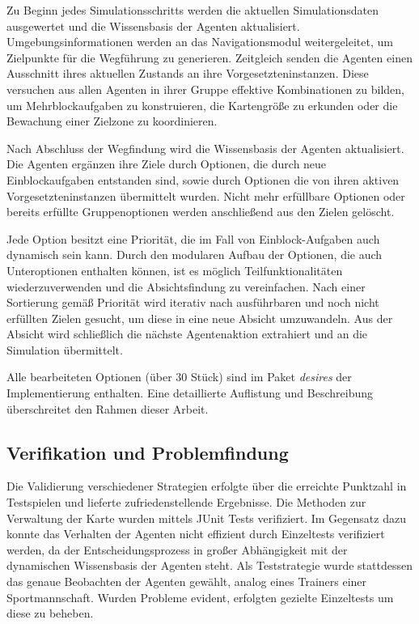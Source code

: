 \documentclass[runningheads]{llncs}
\begin{document}
	Zu Beginn jedes Simulationsschritts werden die aktuellen Simulationsdaten ausgewertet und die Wissensbasis der Agenten aktualisiert. Umgebungsinformationen werden an das Navigationsmodul weitergeleitet, um Zielpunkte für die Wegführung zu generieren. Zeitgleich senden die Agenten einen Ausschnitt ihres aktuellen Zustands an ihre Vorgesetzteninstanzen. Diese versuchen aus allen Agenten in ihrer Gruppe effektive Kombinationen zu bilden, um Mehrblockaufgaben zu konstruieren, die Kartengröße zu erkunden oder die Bewachung einer Zielzone zu koordinieren.
	
	Nach Abschluss der Wegfindung wird die Wissensbasis der Agenten aktualisiert. Die Agenten ergänzen ihre Ziele durch Optionen, die durch neue Einblockaufgaben entstanden sind, sowie durch Optionen die von ihren aktiven Vorgesetzteninstanzen übermittelt wurden. Nicht mehr erfüllbare Optionen oder bereits erfüllte Gruppenoptionen werden anschließend aus den Zielen gelöscht.
	
	Jede Option besitzt eine Priorität, die im Fall von Einblock-Aufgaben auch dynamisch sein kann. Durch den modularen Aufbau der Optionen, die auch Unteroptionen enthalten können, ist es möglich Teilfunktionalitäten wiederzuverwenden und die Absichtsfindung zu vereinfachen. Nach einer Sortierung gemäß Priorität wird iterativ nach ausführbaren und noch nicht erfüllten Zielen gesucht, um diese in eine neue Absicht umzuwandeln. Aus der Absicht wird schließlich die nächste Agentenaktion extrahiert und an die Simulation übermittelt.
	
	Alle bearbeiteten Optionen (über 30 Stück) sind im Paket \textit{desires} der Implementierung enthalten. Eine detaillierte Auflistung und Beschreibung überschreitet den Rahmen dieser Arbeit.
	
	
	\subsection{Verifikation und Problemfindung}\label{verifikation}
	Die Validierung verschiedener Strategien erfolgte über die erreichte Punktzahl in Testspielen und lieferte zufriedenstellende Ergebnisse. Die Methoden zur Verwaltung der Karte wurden mittels JUnit Tests \cite{JUnit} verifiziert. Im Gegensatz dazu konnte das Verhalten der Agenten nicht effizient durch Einzeltests verifiziert werden, da der Entscheidungsprozess in großer Abhängigkeit mit der dynamischen Wissensbasis der Agenten steht.
	Als Teststrategie wurde stattdessen das genaue Beobachten der Agenten gewählt, analog eines Trainers einer Sportmannschaft. Wurden Probleme evident, erfolgten gezielte Einzeltests um diese zu beheben.
	
\end{document}

